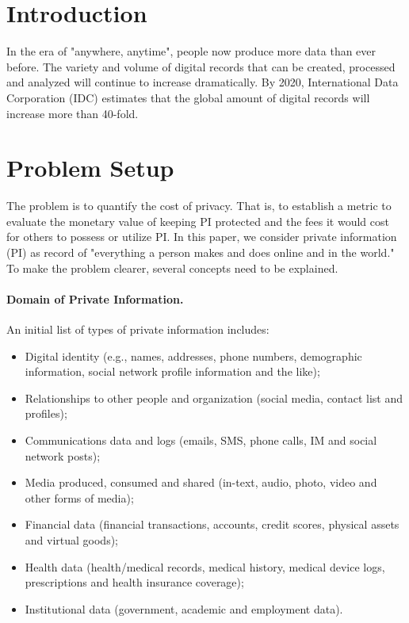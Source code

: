 \documentclass[a4paper,11pt]{texMemo} %
\begin{document}
\maketitle %


\section{Introduction}
In the era of "anywhere, anytime",  people now produce more data than ever before. The variety and volume of digital records that can be created, processed and analyzed will continue to increase dramatically. By 2020, International Data Corporation (IDC) estimates that the global amount of digital records will increase more than 40-fold. 

\section{Problem Setup}
The problem is to quantify the cost of privacy. That is, to establish a metric to evaluate the monetary value of keeping PI protected and the fees it would cost for others to possess or utilize PI. In this paper, we consider private information (PI) as record of "everything a person makes and does online and in the world." To make the problem clearer, several concepts need to be explained.
\paragraph{Domain of Private Information.}   An initial list of types of private information includes:
\begin{itemize}
\item Digital identity (e.g., names, addresses, phone numbers, demographic information, social network profile information and the like);
\item Relationships to other people and organization (social media, contact list and profiles);
\item Communications data and logs (emails, SMS, phone calls, IM and social network posts);
\item Media produced, consumed and shared (in-text, audio, photo, video and other forms of media);
\item Financial data (financial transactions, accounts, credit scores, physical assets and virtual goods);
\item Health data (health/medical records, medical history, medical device logs, prescriptions and health insurance coverage);
\item Institutional data (government, academic and employment data).
\end{itemize}
\end{document}
